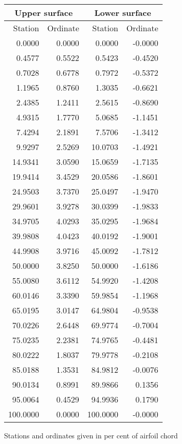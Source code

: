 \documentclass[11pt]{book}
\begin{document}
 \hspace{4mm}
 \begin{tabular}{|r|r|r|r|} \hline 
 \multicolumn{2}{|c|}{Upper surface} & \multicolumn{2}{|c|}{Lower surface} \\
 \hline
 Station & Ordinate & Station & Ordinate \\
 \hline
0.0000 & 0.0000 & 0.0000 & -0.0000 \\
0.4577 & 0.5522 & 0.5423 & -0.4520 \\
0.7028 & 0.6778 & 0.7972 & -0.5372 \\
1.1965 & 0.8760 & 1.3035 & -0.6621 \\
2.4385 & 1.2411 & 2.5615 & -0.8690 \\
4.9315 & 1.7770 & 5.0685 & -1.1451 \\
7.4294 & 2.1891 & 7.5706 & -1.3412 \\
9.9297 & 2.5269 & 10.0703 & -1.4921 \\
14.9341 & 3.0590 & 15.0659 & -1.7135 \\
19.9414 & 3.4529 & 20.0586 & -1.8601 \\
24.9503 & 3.7370 & 25.0497 & -1.9470 \\
29.9601 & 3.9278 & 30.0399 & -1.9833 \\
34.9705 & 4.0293 & 35.0295 & -1.9684 \\
39.9808 & 4.0423 & 40.0192 & -1.9001 \\
44.9908 & 3.9716 & 45.0092 & -1.7812 \\
50.0000 & 3.8250 & 50.0000 & -1.6186 \\
55.0080 & 3.6112 & 54.9920 & -1.4208 \\
60.0146 & 3.3390 & 59.9854 & -1.1968 \\
65.0195 & 3.0147 & 64.9804 & -0.9538 \\
70.0226 & 2.6448 & 69.9774 & -0.7004 \\
75.0235 & 2.2381 & 74.9765 & -0.4481 \\
80.0222 & 1.8037 & 79.9778 & -0.2108 \\
85.0188 & 1.3531 & 84.9812 & -0.0076 \\
90.0134 & 0.8991 & 89.9866 & 0.1356 \\
95.0064 & 0.4529 & 94.9936 & 0.1790 \\
100.0000 & 0.0000 & 100.0000 & -0.0000 \\
 \hline 
 \end{tabular}
 \vspace{8mm}

Stations and ordinates given in per cent of airfoil chord
\end{document}
